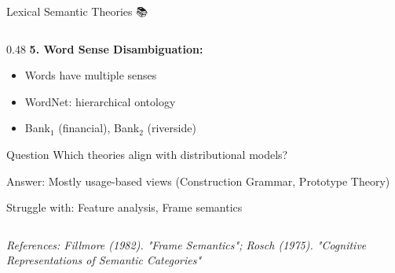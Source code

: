 \documentclass[aspectratio=169]{beamer}
\begin{document}
\begin{frame}[shrink=10]{Lexical Semantic Theories 📚}
\begin{columns}[T]
\begin{column}{0.48\textwidth}
\vspace{0.3em}
\textbf{5. Word Sense Disambiguation:}
\begin{itemize}\setlength{\itemsep}{0pt}
    \item Words have multiple senses
    \item WordNet: hierarchical ontology
    \item Bank$_1$ (financial), Bank$_2$ (riverside)
\end{itemize}

\vspace{1em}
\begin{alertblock}{Question}
Which theories align with distributional models?

\vspace{0.3em}
Answer: Mostly usage-based views (Construction Grammar, Prototype Theory)

\vspace{0.3em}
Struggle with: Feature analysis, Frame semantics
\end{alertblock}
\end{column}
\end{columns}

\vspace{0.5em}
\small
\textit{References: Fillmore (1982). "Frame Semantics"; Rosch (1975). "Cognitive Representations of Semantic Categories"}
\end{frame}
\end{document}

